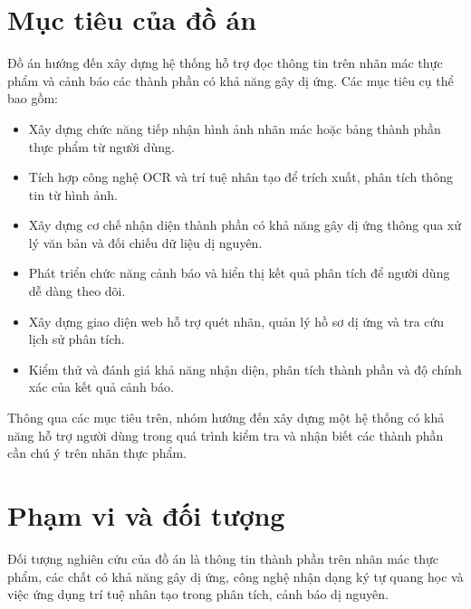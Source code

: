 
\section{Mục tiêu của đồ án}

Đồ án hướng đến xây dựng hệ thống hỗ trợ đọc thông tin trên nhãn mác thực phẩm và cảnh báo các thành phần có khả năng gây dị ứng. Các mục tiêu cụ thể bao gồm:

\begin{itemize}[leftmargin=0pt, label={}, itemsep=3pt]
	\item Xây dựng chức năng tiếp nhận hình ảnh nhãn mác hoặc bảng thành phần thực phẩm từ người dùng.
	
	\item Tích hợp công nghệ OCR và trí tuệ nhân tạo để trích xuất, phân tích thông tin từ hình ảnh.
	
	\item Xây dựng cơ chế nhận diện thành phần có khả năng gây dị ứng thông qua xử lý văn bản và đối chiếu dữ liệu dị nguyên.
	
	\item Phát triển chức năng cảnh báo và hiển thị kết quả phân tích để người dùng dễ dàng theo dõi.
	
	\item Xây dựng giao diện web hỗ trợ quét nhãn, quản lý hồ sơ dị ứng và tra cứu lịch sử phân tích.
	
	\item Kiểm thử và đánh giá khả năng nhận diện, phân tích thành phần và độ chính xác của kết quả cảnh báo.
\end{itemize}

Thông qua các mục tiêu trên, nhóm hướng đến xây dựng một hệ thống có khả năng hỗ trợ người dùng trong quá trình kiểm tra và nhận biết các thành phần cần chú ý trên nhãn thực phẩm.


\section{Phạm vi và đối tượng}

Đối tượng nghiên cứu của đồ án là thông tin thành phần trên nhãn mác thực phẩm, các chất có khả năng gây dị ứng, công nghệ nhận dạng ký tự quang học và việc ứng dụng trí tuệ nhân tạo trong phân tích, cảnh báo dị nguyên.

